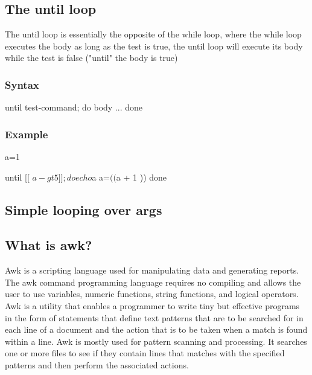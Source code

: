 \documentclass{report}
\begin{document}
    \bigbreak \noindent 
    \subsection{The until loop}
    \bigbreak \noindent 
    The until loop is essentially the opposite of the while loop, where the while loop executes the body as long as the test is true, the until loop will execute its body while the test is false ("until" the body is true)
    \bigbreak \noindent 
    \subsubsection{Syntax}
    \bigbreak \noindent 
    \begin{bashcode}
    until test-command; do 
        body ...
    done
    \end{bashcode}

    \bigbreak \noindent 
    \subsubsection{Example}
    \bigbreak \noindent 
    \begin{bashcode}
    a=1

    until [[ $a -gt 5 ]]; do 
        echo $a
        a=$(( $a + 1 ))
    done
    \end{bashcode}

    \bigbreak \noindent 
    \subsection{Simple looping over args}
    \bigbreak \noindent 
    \bigbreak \noindent 

    \pagebreak 
    \bigbreak \noindent 
    \subsection{What is awk?}
    \bigbreak \noindent 
    Awk is a scripting language used for manipulating data and generating reports. The awk command programming language requires no compiling and allows the user to use variables, numeric functions, string functions, and logical operators. 
    \bigbreak \noindent 
    Awk is a utility that enables a programmer to write tiny but effective programs in the form of statements that define text patterns that are to be searched for in each line of a document and the action that is to be taken when a match is found within a line. Awk is mostly used for pattern scanning and processing. It searches one or more files to see if they contain lines that matches with the specified patterns and then perform the associated actions.
    \bigbreak \noindent 
\end{document}
